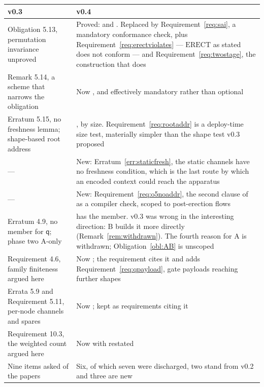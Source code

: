 \documentclass[11pt,a4paper]{article}
\newcommand{\qq}{\mathsf{q}}
\newcommand{\ERECT}{\mathrm{ERECT}}
\theoremstyle{definition}
\theoremstyle{plain}
\begin{document}
\begin{center}
\begin{tabularx}{\linewidth}{@{}l>{\raggedright\arraybackslash}X@{}}
\toprule
v0.3 & v0.4\\
\midrule
Obligation 5.13, permutation invariance unproved & Proved:
\cite[Def.~6.10]{draft3} and \cite[Lem.~6.11]{draft3}. Replaced by
Requirement~\ref{req:sai}, a mandatory conformance check, plus
Requirement~\ref{req:erectviolates} --- $\ERECT$ as stated does not conform
--- and Requirement~\ref{req:twostage}, the construction that does\\
Remark 5.14, a scheme that narrows the obligation & Now
\cite[Rem.~6.12]{draft3}, and effectively mandatory rather than optional\\
Erratum 5.15, no freshness lemma; shape-based root address &
\cite[Lem.~6.14]{draft3}, by size. Requirement~\ref{req:rootaddr} is a
deploy-time size test, materially simpler than the shape test v0.3
proposed\\
--- & New: Erratum~\ref{err:staticfresh}, the static channels have no
freshness condition, which is the last route by which an encoded context
could reach the apparatus\\
--- & New: Requirement~\ref{req:o5noaddr}, the second clause of
\cite[Lem.~6.14]{draft3} as a compiler check, scoped to post-erection flows\\
Erratum 4.9, no member for $\qq$; phase two A-only &
\cite[Def.~3.8]{draft3} has the member. v0.3 was wrong in the interesting
direction: B builds it more directly (Remark~\ref{rem:withdrawn}). The fourth
reason for A is withdrawn; Obligation~\ref{obl:AB} is unscoped\\
Requirement 4.6, family finiteness argued here & Now
\cite[Rem.~6.15]{draft3}; the requirement cites it and adds
Requirement~\ref{req:qpayload}, gate payloads reaching further shapes\\
Errata 5.9 and Requirement 5.11, per-node channels and spares & Now
\cite[Rem.~6.13]{draft3}; kept as requirements citing it\\
Requirement 10.3, the weighted count argued here & Now
\cite[Lem.~9.2]{draft3} with \cite[Prop.~9.9]{draft3} restated\\
Nine items asked of the papers & Six, of which seven were discharged, two
stand from v0.2 and three are new\\
\bottomrule
\end{tabularx}
\end{center}
\end{document}
